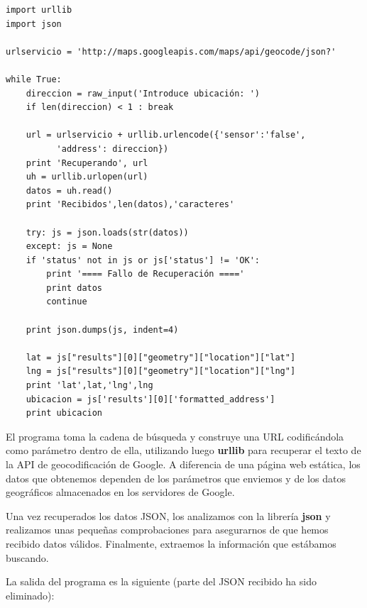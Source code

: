 \beforeverb
\begin{verbatim}
import urllib
import json

urlservicio = 'http://maps.googleapis.com/maps/api/geocode/json?'

while True:
    direccion = raw_input('Introduce ubicación: ')
    if len(direccion) < 1 : break

    url = urlservicio + urllib.urlencode({'sensor':'false', 
          'address': direccion})
    print 'Recuperando', url
    uh = urllib.urlopen(url)
    datos = uh.read()
    print 'Recibidos',len(datos),'caracteres'

    try: js = json.loads(str(datos))
    except: js = None
    if 'status' not in js or js['status'] != 'OK':
        print '==== Fallo de Recuperación ===='
        print datos
        continue

    print json.dumps(js, indent=4)

    lat = js["results"][0]["geometry"]["location"]["lat"]
    lng = js["results"][0]["geometry"]["location"]["lng"]
    print 'lat',lat,'lng',lng
    ubicacion = js['results'][0]['formatted_address']
    print ubicacion
\end{verbatim}
\afterverb
%
El programa toma la cadena de búsqueda y construye una URL
codificándola como parámetro dentro de ella, utilizando luego
{\bf urllib} para recuperar el texto de la API de geocodificación de Google.
A diferencia de una página web estática, los datos que obtenemos dependen de los
parámetros que enviemos y de los datos geográficos almacenados en los servidores de Google.

Una vez recuperados los datos JSON, los analizamos con la librería
{\bf json} y realizamos unas pequeñas comprobaciones para asegurarnos de que hemos recibido
datos válidos. Finalmente, extraemos la información que estábamos buscando.

La salida del programa es la siguiente (parte del JSON recibido
ha sido eliminado):

